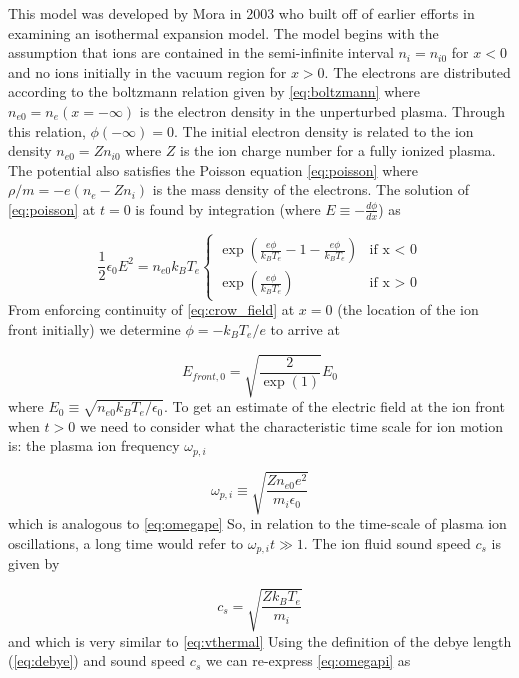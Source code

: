 This model was developed by Mora \cite{Mora_2003_PRL} in 2003 who built off of earlier efforts \cite{Crow_1975_JPP,Kishimoto_1983_PoF} in examining an isothermal expansion model. The model begins with the assumption that ions are contained in the semi-infinite interval $n_i = n_{i0}$ for $x < 0$ and no ions initially in the vacuum region for $x > 0$. The electrons are distributed according to the boltzmann relation given by \cref{eq:boltzmann} where $n_{e0} = n_e(x = -\infty)$ is the electron density in the unperturbed plasma. Through this relation, $\phi(-\infty) = 0$. The initial electron density is related to the ion density $n_{e0} = Z n_{i0}$ where $Z$ is the ion charge number for a fully ionized plasma. The potential also satisfies the Poisson equation \cref{eq:poisson} where $\rho/m = - e (n_e - Z n_i)$ is the mass density of the electrons. The solution of \cref{eq:poisson} at $t=0$ is found by integration \cite{Crow_1975_JPP} (where $E \equiv -\frac{d\phi}{dx}$) as 

\begin{equation}
	\frac{1}{2} \epsilon_0 E^2 = n_{e0} k_B T_e
	\begin{cases}
		\exp(\frac{e \phi}{k_B T_e} - 1 - \frac{e \phi}{k_B T_e}) & \mbox{if x < 0} \\
		\exp(\frac{e \phi}{k_B T_e}) & \mbox{if x > 0} \label{eq:crow_field}
	\end{cases}
\end{equation} 
From enforcing continuity of \cref{eq:crow_field} at $x=0$ (the location of the ion front initially) we determine $\phi = -k_B T_e / e$ to arrive at  

\begin{equation}
	E_{front,0} = \sqrt{\frac{2}{\exp(1)}} E_0
\end{equation}
where $E_0 \equiv \sqrt{n_{e0} k_B T_e / \epsilon_0}$. To get an estimate of the electric field at the ion front when $t > 0$ we need to consider what the characteristic time scale for ion motion is: the plasma ion frequency $\omega_{p,i}$

\begin{equation}
	\omega_{p,i} \equiv \sqrt{\frac{Z n_{e0} e^2}{m_i \epsilon_0}}	\label{eq:omegapi}
\end{equation} 
which is analogous to \cref{eq:omegape} So, in relation to the time-scale of plasma ion oscillations, a long time would refer to $\omega_{p,i} t \gg 1$. The ion fluid sound speed $c_s$ is given by 

\begin{equation}
	c_s = \sqrt{\frac{Z k_B T_e}{m_i}} \label{eq:soundspeed}
\end{equation}
and which is very similar to \cref{eq:vthermal} Using the definition of the debye length (\cref{eq:debye}) and sound speed $c_s$ we can re-express \cref{eq:omegapi} as 

